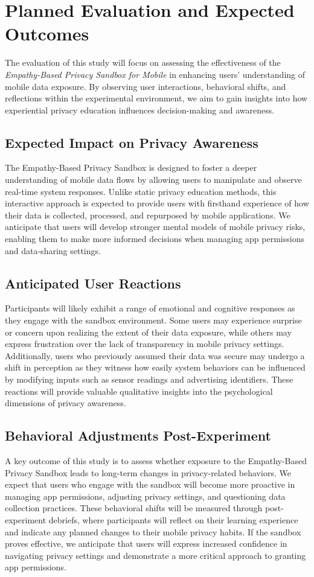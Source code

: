 \documentclass[acmlarge, nonacm]{acmart}
\begin{document}
\section{Planned Evaluation and Expected Outcomes}
The evaluation of this study will focus on assessing the effectiveness of the \textit{Empathy-Based Privacy Sandbox for Mobile} in enhancing users' understanding of mobile data exposure. By observing user interactions, behavioral shifts, and reflections within the experimental environment, we aim to gain insights into how experiential privacy education influences decision-making and awareness.

\subsection{Expected Impact on Privacy Awareness}

The Empathy-Based Privacy Sandbox is designed to foster a deeper understanding of mobile data flows by allowing users to manipulate and observe real-time system responses. Unlike static privacy education methods, this interactive approach is expected to provide users with firsthand experience of how their data is collected, processed, and repurposed by mobile applications. We anticipate that users will develop stronger mental models of mobile privacy risks, enabling them to make more informed decisions when managing app permissions and data-sharing settings.

\subsection{Anticipated User Reactions}
Participants will likely exhibit a range of emotional and cognitive responses as they engage with the sandbox environment. Some users may experience surprise or concern upon realizing the extent of their data exposure, while others may express frustration over the lack of transparency in mobile privacy settings. Additionally, users who previously assumed their data was secure may undergo a shift in perception as they witness how easily system behaviors can be influenced by modifying inputs such as sensor readings and advertising identifiers. These reactions will provide valuable qualitative insights into the psychological dimensions of privacy awareness.

\subsection{Behavioral Adjustments Post-Experiment}
A key outcome of this study is to assess whether exposure to the Empathy-Based Privacy Sandbox leads to long-term changes in privacy-related behaviors. We expect that users who engage with the sandbox will become more proactive in managing app permissions, adjusting privacy settings, and questioning data collection practices. These behavioral shifts will be measured through post-experiment debriefs, where participants will reflect on their learning experience and indicate any planned changes to their mobile privacy habits. If the sandbox proves effective, we anticipate that users will express increased confidence in navigating privacy settings and demonstrate a more critical approach to granting app permissions.
\end{document}
